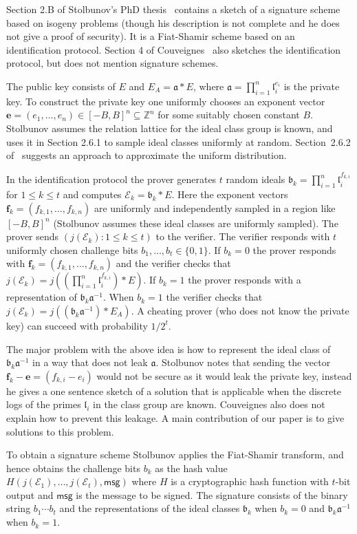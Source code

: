 \documentclass{llncs}
\newcommand{\E}{\mathcal{E}}
\newcommand{\Z}{\mathbb{Z}}
\newcommand{\msg}{\mathsf{msg}}
\renewcommand{\a}{\mathfrak{a}}
\renewcommand{\b}{\mathfrak{b}}
\renewcommand{\l}{\mathfrak{l}}
\newcommand{\e}{\mathbf{e}}
\newcommand{\f}{\mathbf{f}}
\begin{document}
Section 2.B of Stolbunov's PhD thesis~\cite{Sto12} contains a sketch of a signature scheme based on isogeny problems (though his description is not complete and he does not give a proof of security).
It is a Fiat-Shamir scheme based on an identification protocol.
Section 4 of Couveignes~\cite{Couv06} also sketches the identification protocol, but does not mention signature schemes.


The public key consists of $E$ and $E_A = \a * E$, where $\a = \prod_{i=1}^n \l_i^{e_i}$ is the private key.
To construct the private key one uniformly chooses an exponent vector $\e = (e_1, \dots, e_n) \in [-B,B]^n \subseteq \Z^n$ for some suitably chosen constant $B$.
Stolbunov assumes the relation lattice for the ideal class group is known, and uses it in Section 2.6.1 to sample ideal classes uniformly at random.
Section~2.6.2 of~\cite{Sto12} suggests an approach to approximate the uniform distribution.

In the identification protocol the prover generates $t$ random ideals $\b_k = \prod_{i=1}^n \l_i^{f_{k,i}}$ for $1 \le k \le t$ and computes $\E_k = \b_k * E$.
Here the exponent vectors $\f_k = ( f_{k,1}, \dots, f_{k,n} )$ are uniformly and independently sampled in a region like $[-B,B]^n$ (Stolbunov assumes these ideal classes are uniformly sampled).
The prover sends $(j( \E_k ) : 1 \le k \le t )$ to the verifier.
The verifier responds with $t$ uniformly chosen challenge bits $b_1, \dots, b_t \in \{0,1\}$.
If $b_k = 0$ the prover responds with $\f_k = ( f_{k,1}, \dots, f_{k,n} )$ and the verifier checks that $j(\E_k) = j( (\prod_{i=1}^n \l_i^{f_{k,i}}) * E )$.
If $b_k = 1$ the prover responds with a representation of $\b_k \a^{-1}$.
When $b_k=1$ the verifier checks that $j(\E_k) = j( (\b_k \a^{-1}) * E_A )$.
A cheating prover (who does not know the private key) can succeed with probability $1/2^t$.

The major problem with the above idea is how to represent the ideal class of $\b_k \a^{-1}$ in a way that does not leak $\a$.
Stolbunov notes that sending the vector $\f_k - \e = (f_{k,i} - e_i )$ would not be secure as it would leak the private key, instead he gives a one sentence sketch of a solution that is applicable when the discrete logs of the primes $\l_i$ in the class group are known.
Couveignes also does not explain how to prevent this leakage.
A main contribution of our paper is to give solutions to this problem.

To obtain a signature scheme Stolbunov applies the Fiat-Shamir transform, and hence obtains the challenge bits $b_k$ as the hash value $H( j(\E_1), \dots, j(\E_t) , \msg )$ where $H$ is a cryptographic hash function with $t$-bit output and $\msg$ is the message to be signed.
The signature consists of the binary string $b_1\cdots b_t$ and the representations of the ideal classes $\b_k$ when $b_k = 0$ and $\b_k \a^{-1}$ when $b_k = 1$.
\end{document}
